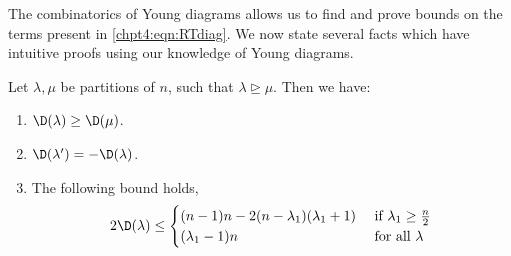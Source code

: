 \documentclass[11pt]{report}
\begin{document}
The combinatorics of Young diagrams allows us to find and prove 
bounds on the terms present in \eqref{chpt4:eqn:RTdiag}.
We now state several facts which have intuitive proofs using our knowledge of Young diagrams.

\begin{lemma}
	\label{chpt4:lem:diagbounds}
	Let $\lambda,\mu$ be partitions of $n$,  such that $\lambda 
	\trianglerighteq \mu$. Then we have:
	\begin{enumerate}
		\item $\D(\lambda) \geq \D(\mu)$.
		\item $\D(\lambda^{\prime}) = - \D(\lambda)$.
		\item The following bound holds,
		\begin{eqnarray}
		2\D(\lambda) \leq \begin{cases}
		(n-1)n - 2(n-\lambda_{1})(\lambda_{1}+1) & 
		\textnormal{ 
			if } \lambda_{1} \geq \frac{n}{2}\\
		(\lambda_{1}-1)n & \textnormal{ for all } \lambda  
		\end{cases}
		\end{eqnarray}
	\end{enumerate}
\end{lemma}
\end{document}
